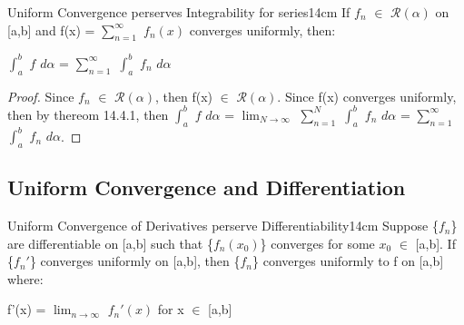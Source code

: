     \vspace{0.5cm}


    \begin{wtheorem}{Uniform Convergence perserves Integrability for series}{14cm}
        If $f_n$ $\in$ $\mathscr{R}(\alpha)$ on [a,b] and
        f(x) = $\sum_{n=1}^{\infty}$ $f_n(x)$ converges uniformly, then:

        \hspace{0.5cm}
        $\int_a^b$ $f$ $d\alpha$ = $\sum_{n=1}^{\infty}$ $\int_a^b$ $f_n$ $d\alpha$
    \end{wtheorem}

    \begin{proof}
        Since $f_n$ $\in$ $\mathscr{R}(\alpha)$, then
        f(x) $\in$ $\mathscr{R}(\alpha)$. Since f(x) converges uniformly, then
        by {\color{red} thereom 14.4.1}, then
        $\int_a^b$ $f$ $d\alpha$
        = $\lim_{N \rightarrow \infty}$ $\sum_{n=1}^{N}$ $\int_a^b$ $f_n$ $d\alpha$
        = $\sum_{n=1}^{\infty}$ $\int_a^b$ $f_n$ $d\alpha$.
    \end{proof}

    \newpage





\subsection[ Differentiation ]{ Uniform Convergence and Differentiation }

    \begin{wtheorem}{Uniform Convergence of Derivatives perserve Differentiability}{14cm}
        Suppose \{$f_n$\} are differentiable on [a,b] such that
        \{$f_n(x_0)$\} converges for some $x_0$ $\in$ [a,b]. If
        \{$f_n'$\} converges uniformly on [a,b], then \{$f_n$\}
        converges uniformly to f on [a,b] where:

        \hspace{0.5cm}
        f'(x) = $\lim_{n \rightarrow \infty}$ $f_n'(x)$
        \hspace{1cm}
        for x $\in$ [a,b]
    \end{wtheorem}

